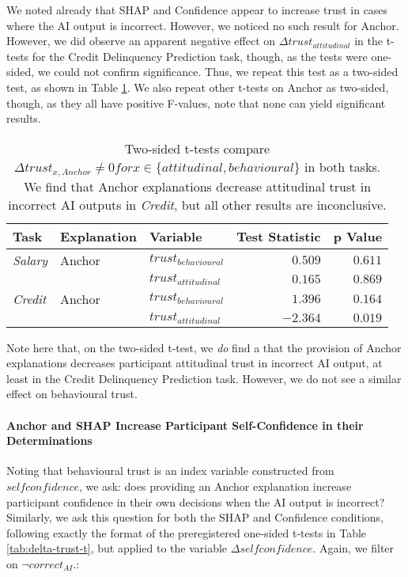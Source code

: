 We noted already that SHAP and Confidence appear to increase trust in cases where the AI output is incorrect. However, we noticed no such result for Anchor. However, we did observe an apparent negative effect on $\Delta trust_{attitudinal}$ in the t-tests for the Credit Delinquency Prediction task, though, as the tests were one-sided, we could not confirm significance. Thus, we repeat this test as a two-sided test, as shown in Table \ref{tab:delta-trust-t-2}. We also repeat other t-tests on Anchor as two-sided, though, as they all have positive F-values, note that none can yield significant results.

\begin{table}[htb]
    \centering
    \caption{Two-sided t-tests compare $\Delta trust_{x,Anchor} \neq 0 for x \in \{attitudinal, behavioural\}$ in both tasks. We find that Anchor explanations decrease attitudinal trust in incorrect AI outputs in \emph{Credit}, but all other results are inconclusive.}
    \label{tab:delta-trust-t-2}
    \begin{tabular}{lllrr}
        \toprule
        Task & Explanation & Variable & Test Statistic & p Value \\ 
        \midrule
        \emph{Salary} & Anchor & $trust_{behavioural}$ & $0.509$ & $0.611$ \\
        & & $trust_{attitudinal}$ & $0.165$ & $0.869$ \\
        \midrule
        \emph{Credit} & Anchor & $trust_{behavioural}$ & $1.396$ & $0.164$ \\
        & & $trust_{attitudinal}$ & $\mathbf{-2.364}$ & $\mathbf{0.019}$ \\
        \bottomrule
    \end{tabular}
\end{table}

Note here that, on the two-sided t-test, we \textit{do} find a that the provision of Anchor explanations decreases participant attitudinal trust in incorrect AI output, at least in the Credit Delinquency Prediction task. However, we do not see a similar effect on behavioural trust. 

\paragraph{Anchor and SHAP Increase Participant Self-Confidence in their Determinations}
Noting that behavioural trust is an index variable constructed from $selfconfidence$, we ask: does providing an Anchor explanation increase participant confidence in their own decisions when the AI output is incorrect? Similarly, we ask this question for both the SHAP and Confidence conditions, following exactly the format of the preregistered one-sided t-tests in Table \ref{tab:delta-trust-t}, but applied to the variable $\Delta selfconfidence$. Again, we filter on $\neg correct_{AI}$.:

